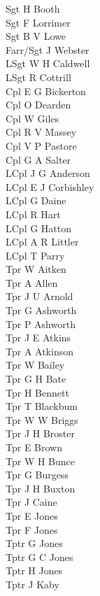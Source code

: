\begin{multicols}{2}
  \noindent
  Sgt H Booth \\
  Sgt F Lorrimer \\
  Sgt B V Lowe \\
  Farr/Sgt J Webster \\
  LSgt W H Caldwell \\
  LSgt R Cottrill \\
  Cpl E G Bickerton \\
  Cpl O Dearden \\
  Cpl W Giles \\
  Cpl R V Massey \\
  Cpl V P Pastore \\
  Cpl G A Salter \\
  LCpl J G Anderson \\
  LCpl E J Corbishley \\
  LCpl G Daine \\
  LCpl R Hart \\
  LCpl G Hatton \\
  LCpl A R Littler \\
  LCpl T Parry \\
  Tpr W Aitken \\
  Tpr A Allen \\
  Tpr J U Arnold \\
  Tpr G Ashworth \\
  Tpr P Ashworth \\
  Tpr J E Atkins \\
  Tpr A Atkinson \\
  Tpr W Bailey \\
  Tpr G H Bate \\
  Tpr H Bennett \\
  Tpr T Blackbum \\
  Tpr W W Briggs \\
  Tpr J H Broster \\
  Tpr E Brown \\
  Tpr W H Bunce \\
  Tpr G Burgess \\
  Tpr J H Buxton \\
  Tpr J Caine \\
  Tpr E Jones \\
  Tpr F Jones \\
  Tptr G Jones \\
  Tptr G C Jones \\
  Tptr H Jones \\
  Tptr J Kaby \\

\end{multicols}

